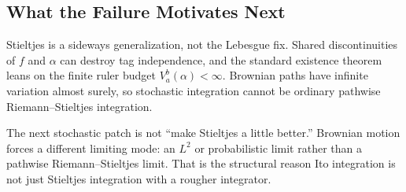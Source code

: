 \subsection*{What the Failure Motivates Next}

\begin{remark*}[Interpretation]
Stieltjes is a sideways generalization, not the Lebesgue fix. Shared
discontinuities of \(f\) and \(\alpha\) can destroy tag independence, and the
standard existence theorem leans on the finite ruler budget
\(V_a^b(\alpha)<\infty\). Brownian paths have infinite variation almost surely,
so stochastic integration cannot be ordinary pathwise Riemann--Stieltjes
integration.
\end{remark*}

\begin{remark*}[Interpretation]
The next stochastic patch is not ``make Stieltjes a little better.'' Brownian
motion forces a different limiting mode: an \(L^2\) or probabilistic limit
rather than a pathwise Riemann--Stieltjes limit. That is the structural reason
Ito integration is not just Stieltjes integration with a rougher integrator.
\end{remark*}
